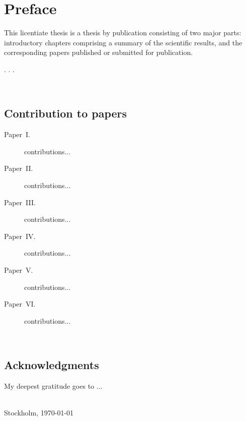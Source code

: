 
\chapter*{Preface}


This licentiate thesis is a thesis by publication consisting of two
major parts:  introductory chapters comprising a summary of the
scientific results, and  the corresponding papers published or submitted
for publication.

. . .

\clearpage~\vspace{14mm}

\section*{Contribution to papers}
\vspace{5mm}

\begin{description}
  
\item [{Paper~I.}] 
contributions...

\item [{Paper~II.}] 
contributions...

\item [{Paper~III.}] 
contributions...

\item [{Paper~IV.}] 
contributions...

\item [{Paper~V.}] 
contributions...

\item [{Paper~VI.}] 
contributions...
\end{description}

\clearpage~\vspace{14mm}

\section*{Acknowledgments}

\vspace{5mm}

My deepest gratitude goes to ...



\vspace{5mm}
\noindent \begin{flushright}
\licAuthor\\
Stockholm, \today
\par\end{flushright}
